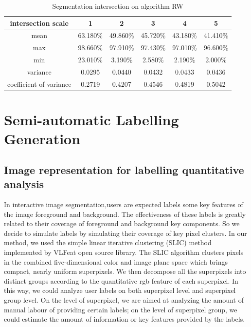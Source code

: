 \documentclass[runningheads,a4paper]{llncs}
\begin{document}
\begin{table}
\centering
\begin{tabular}{|c|c|c|c|c|c|}
\hline
intersection scale & 1 & 2 & 3 & 4& 5 \\
\hline
mean& 63.180\% & 49.860\% & 45.720\% & 43.180\%& 41.410\% \\
\hline
max& 98.660\% & 97.910\% & 97.430\% & 97.010\%& 96.600\% \\
\hline
min& 23.010\% & 3.190\% & 2.580\% & 2.190\%& 2.000\%\\
\hline
variance& 0.0295 & 0.0440 & 0.0432 & 0.0433& 0.0436 \\
\hline
coefficient of variance& 0.2719 & 0.4207 & 0.4546 & 0.4819& 0.5042\\
\hline
\end{tabular}
\caption{Segmentation intersection on algorithm RW}
\label{ta:rw intersection}
\end{table}


\section{Semi-automatic Labelling Generation}

\subsection{Image representation for labelling quantitative analysis}
 In interactive image segmentation,users are expected labels some key features of the image foreground and background. The effectiveness of these labels is greatly related to their coverage of foreground and background key components. So we decide to simulate labels by simulating their coverage of key pixel clusters. In our method, we used the simple linear iterative clustering (SLIC)  method \cite{achanta2010slic} implemented by VLFeat open source library\cite{vedaldi08vlfeat}. The SLIC algorithm clusters pixels in the combined five-dimensional color and image plane space which brings compact, nearly uniform superpixels. We then decompose all the superpixels into distinct groups according to the quantitative rgb feature of each superpixel. In this way, we could analyze user labels on both superpixel level and superpixel group level.  On the level of superpixel, we are aimed at analyzing the amount of manual labour of providing certain labels; on the level of superpixel group, we could estimate the amount of information or key features provided by the labels.
\end{document}
